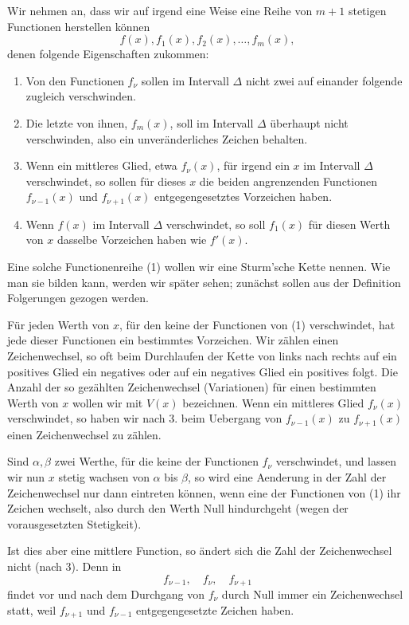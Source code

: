 \documentclass[11pt]{article}
\begin{document}
Wir nehmen an, dass wir auf irgend eine Weise eine Reihe von $m+1$ stetigen Functionen herstellen k\"onnen
\begin{equation}
        f(x), f_1(x), f_2(x),\ldots, f_m(x),
\tag{1}
\end{equation}
denen folgende Eigenschaften zukommen:
\begin{enumerate}[label=\arabic*.,leftmargin=2.8em]
\item Von den Functionen $f_\nu$ sollen im Intervall $\Delta$ nicht zwei auf einander folgende zugleich verschwinden.
\item Die letzte von ihnen, $f_m(x)$, soll im Intervall $\Delta$ \"uberhaupt nicht verschwinden, also ein unver\"anderliches Zeichen behalten.
\item Wenn ein mittleres Glied, etwa $f_\nu(x)$, f\"ur irgend ein $x$ im Intervall $\Delta$ verschwindet, so sollen f\"ur dieses $x$ die beiden angrenzenden Functionen $f_{\nu-1}(x)$ und $f_{\nu+1}(x)$ entgegengesetztes Vorzeichen haben.
\item Wenn $f(x)$ im Intervall $\Delta$ verschwindet, so soll $f_1(x)$ f\"ur diesen Werth von $x$ dasselbe Vorzeichen haben wie $f'(x)$.
\end{enumerate}
Eine solche Functionenreihe (1) wollen wir eine Sturm'sche Kette nennen. Wie man sie bilden kann, werden wir sp\"ater sehen; zun\"achst sollen aus der Definition Folgerungen gezogen werden.

F\"ur jeden Werth von $x$, f\"ur den keine der Functionen von (1) verschwindet, hat jede dieser Functionen ein bestimmtes Vorzeichen. Wir z\"ahlen einen Zeichenwechsel, so oft beim Durchlaufen der Kette von links nach rechts auf ein positives Glied ein negatives oder auf ein negatives Glied ein positives folgt. Die Anzahl der so gez\"ahlten Zeichenwechsel (Variationen) f\"ur einen bestimmten Werth von $x$ wollen wir mit $V(x)$ bezeichnen. Wenn ein mittleres Glied $f_\nu(x)$ verschwindet, so haben wir nach 3. beim Uebergang von $f_{\nu-1}(x)$ zu $f_{\nu+1}(x)$ einen Zeichenwechsel zu z\"ahlen.

Sind $\alpha,\beta$ zwei Werthe, f\"ur die keine der Functionen $f_\nu$ verschwindet, und lassen wir nun $x$ stetig wachsen von $\alpha$ bis $\beta$, so wird eine Aenderung in der Zahl der Zeichenwechsel nur dann eintreten k\"onnen, wenn eine der Functionen von (1) ihr Zeichen wechselt, also durch den Werth Null hindurchgeht (wegen der vorausgesetzten Stetigkeit).

Ist dies aber eine mittlere Function, so \"andert sich die Zahl der Zeichenwechsel nicht (nach 3). Denn in
\[
        f_{\nu-1},\quad f_\nu,\quad f_{\nu+1}
\]
findet vor und nach dem Durchgang von $f_\nu$ durch Null immer ein Zeichenwechsel statt, weil $f_{\nu+1}$ und $f_{\nu-1}$ entgegengesetzte Zeichen haben.
\end{document}
